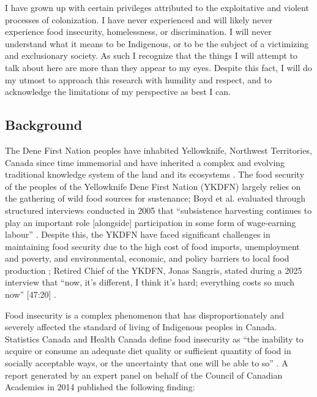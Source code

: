 \documentclass{report}
\begin{document}
\hspace{24pt} I have grown up with certain privileges attributed to the exploitative and violent processes of colonization. I have never experienced and will likely never experience food insecurity, homelessness, or discrimination. I will never understand what it means to be Indigenous, or to be the subject of a victimizing and exclusionary society. As such I recognize that the things I will attempt to talk about here are more than they appear to my eyes. Despite this fact, I will do my utmost to approach this research with humility and respect, and to acknowledge the limitations of my perspective as best I can.

\clearpage

\subsection{Background}

\hspace{24pt} The Dene First Nation peoples have inhabited Yellowknife, Northwest Territories, Canada since time immemorial and have inherited a complex and evolving traditional knowledge system of the land and its ecosystems \parencite{lorecapturingtraditional}.
The food security of the peoples of the Yellowknife Dene First Nation (YKDFN) largely relies on the gathering of wild food sources for sustenance;
Boyd et al. evaluated through structured interviews conducted in 2005 that ``subsistence harvesting continues to play an important role [alongside] participation in some form of wage-earning labour'' \parencite[268]{socialculturalcapital}.
Despite this, the YKDFN have faced significant challenges in maintaining food security due to the high cost of food imports, unemployment and poverty, and environmental, economic, and policy barriers to local food production \parencite{resilientcommunities};
Retired Chief of the YKDFN, Jonas Sangris, stated during a 2025 interview that ``now, it's different, I think it's hard; everything costs so much now'' [47:20] \parencite{jonassangris}.

\hspace{24pt} Food insecurity is a complex phenomenon that has disproportionately and severely affected the standard of living of Indigenous peoples in Canada.
Statistics Canada and Health Canada define food insecurity as ``the inability to acquire or consume an adequate diet quality or sufficient quantity of food in socially acceptable ways, or the uncertainty that one will be able to so'' \parencite{statscanfoodinsecurity}.
A report generated by an expert panel on behalf of the Council of Canadian Academies in 2014 published the following finding:
\end{document}

